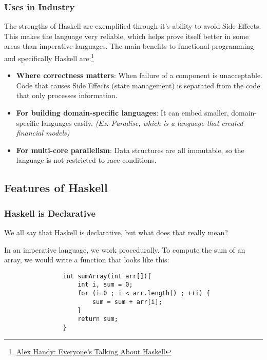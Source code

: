 \documentclass{article}
\begin{document}
        \subsubsection{Uses in Industry}
        The strengths of Haskell are exemplified through it's ability to avoid Side Effects. This makes the language very reliable, which helps prove itself better in some areas than imperative languages. The main benefits to functional programming and specifically Haskell are:\footnote{\href{http://web.archive.org/web/20130203023724/http://www.sdtimes.com/blog/post/2009/07/27/Everyonee28099s-talking-about-Haskell.aspx}{Alex Handy: Everyone's Talking About Haskell}}
        \begin{itemize}
            \item \textbf{Where correctness matters}: When failure of a component is unacceptable. Code that causes Side Effects (state management) is separated from the code that only processes information.
            \item \textbf{For building domain-specific languages}: It can embed smaller, domain-specific languages easily. \textit{(Ex: Paradise, which is a language that created financial models)}
            \item \textbf{For multi-core parallelism}: Data structures are all immutable, so the language is not restricted to race conditions.
        \end{itemize}
        
    \subsection{Features of Haskell}
    
        \subsubsection{Haskell is Declarative}
        We all say that Haskell is declarative, but what does that really mean?
        
            \medskip\noindent
            In an imperative language, we work procedurally. To compute the sum of an array, we would write a function that looks like this:
            \begin{lstlisting}
                int sumArray(int arr[]){
                    int i, sum = 0;
                    for (i=0 ; i < arr.length() ; ++i) {
                        sum = sum + arr[i];
                    }
                    return sum;
                }
            \end{lstlisting}
            
\end{document}
